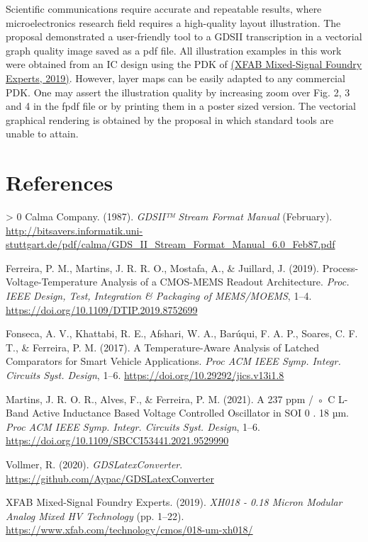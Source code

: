 \documentclass[10pt,a4paper,onecolumn]{article}
\let\textttOrig=\texttt
\def\texttt#1{\expandafter\textttOrig{\seqsplit{#1}}}
\newlength{\cslhangindent}
\newenvironment{CSLReferences}[3] %
 {%
  \setlength{\parindent}{0pt}
  \ifodd #1 \everypar{\setlength{\hangindent}{\cslhangindent}}\ignorespaces\fi
  \ifnum #2 > 0
  \setlength{\parskip}{#2\baselineskip}
  \fi
 }%
 {}
\let\addcontentslineOrig=\addcontentsline
\def\addcontentsline#1#2#3{\bgroup
  \let\texttt=\textttOrig\addcontentslineOrig{#1}{#2}{#3}\egroup}
\begin{document}
Scientific communications require accurate and repeatable results, where
microelectronics research field requires a high-quality layout
illustration. The proposal demonstrated a user-friendly tool to a GDSII
transcription in a vectorial graph quality image saved as a pdf file.
All illustration examples in this work were obtained from an IC design
using the PDK of \hyperlink{ref-XFAB2019}{(XFAB Mixed-Signal Foundry Experts, 2019)}. However,
layer maps can be easily adapted to any commercial PDK. One may assert
the illustration quality by increasing zoom over Fig. 2, 3 and 4 in the
fpdf file or by printing them in a poster sized version. The vectorial
graphical rendering is obtained by the proposal in which standard tools
are unable to attain.

\hypertarget{references}{%
\section*{References}\label{references}}

\hypertarget{refs}{}
\begin{CSLReferences}{1}{0}
\leavevmode\hypertarget{ref-Calma1987}{}%
Calma Company. (1987). \emph{{GDSII™ Stream Format Manual}} (February).
\url{http://bitsavers.informatik.uni-stuttgart.de/pdf/calma/GDS_II_Stream_Format_Manual_6.0_Feb87.pdf}

\leavevmode\hypertarget{ref-Ferreira2019b}{}%
Ferreira, P. M., Martins, J. R. R. O., Mostafa, A., \& Juillard, J.
(2019). {Process-Voltage-Temperature Analysis of a CMOS-MEMS Readout
Architecture}. \emph{Proc. IEEE Design, Test, Integration \& Packaging
of MEMS/MOEMS}, 1--4. \url{https://doi.org/10.1109/DTIP.2019.8752699}

\leavevmode\hypertarget{ref-Fonseca2017}{}%
Fonseca, A. V., Khattabi, R. E., Afshari, W. A., Barúqui, F. A. P.,
Soares, C. F. T., \& Ferreira, P. M. (2017). {A Temperature-Aware
Analysis of Latched Comparators for Smart Vehicle Applications}.
\emph{Proc ACM IEEE Symp. Integr. Circuits Syst. Design}, 1--6.
\url{https://doi.org/10.29292/jics.v13i1.8}

\leavevmode\hypertarget{ref-Martins2021}{}%
Martins, J. R. O. R., Alves, F., \& Ferreira, P. M. (2021). {A 237 ppm /
◦ C L-Band Active Inductance Based Voltage Controlled Oscillator in SOI
0 . 18 µm}. \emph{Proc ACM IEEE Symp. Integr. Circuits Syst. Design},
1--6. \url{https://doi.org/10.1109/SBCCI53441.2021.9529990}

\leavevmode\hypertarget{ref-Vollmer2020}{}%
Vollmer, R. (2020). \emph{{GDSLatexConverter}}.
\url{https://github.com/Aypac/GDSLatexConverter}

\leavevmode\hypertarget{ref-XFAB2019}{}%
XFAB Mixed-Signal Foundry Experts. (2019). \emph{{XH018 - 0.18 Micron
Modular Analog Mixed HV Technology}} (pp. 1--22).
\url{https://www.xfab.com/technology/cmos/018-um-xh018/}

\end{CSLReferences}
\end{document}
